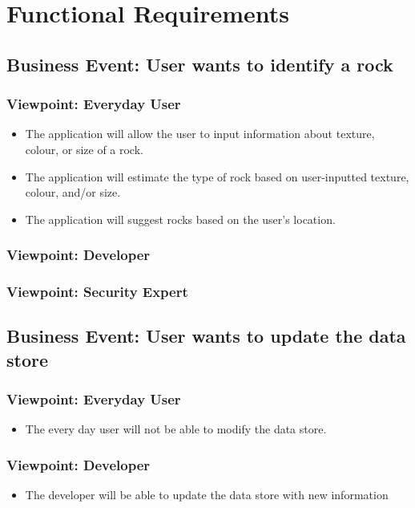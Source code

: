 \documentclass[titlepage]{article}
\begin{document}
\section{Functional Requirements}
\subsection {Business Event: User wants to identify a rock}
  \subsubsection {Viewpoint: Everyday User}
    \begin{itemize}
      \item The application will allow the user to input information about texture, colour, or size of a rock.
      \item The application will estimate the type of rock based on user-inputted texture, colour, and/or size.
      \item The application will suggest rocks based on the user's location.
    \end{itemize}
  \subsubsection {Viewpoint: Developer}
  \subsubsection {Viewpoint: Security Expert}
\subsection {Business Event: User wants to update the data store}
  \subsubsection {Viewpoint: Everyday User}
    \begin{itemize}
      \item The every day user will not be able to modify the data store.
    \end{itemize}
  \subsubsection {Viewpoint: Developer}
    \begin{itemize}
      \item The developer will be able to update the data store with new information
    \end{itemize}
\end{document}
